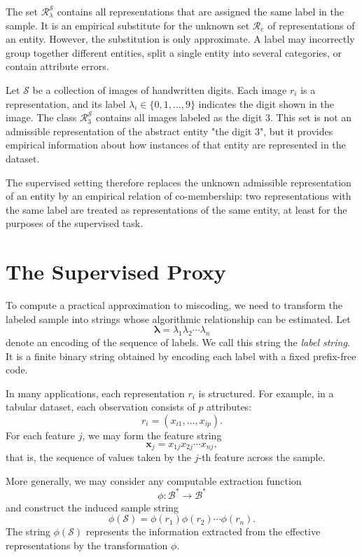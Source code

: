The set $\mathcal {R}_{\lambda}^{\mathcal S}$ contains all representations that are assigned the same label in the sample. It is an empirical substitute for the unknown set $\mathcal{R}_e$ of representations of an entity. However, the substitution is only approximate. A label may incorrectly group together different entities, split a single entity into several categories, or contain attribute errors.

\begin{example}
Let $\mathcal S$ be a collection of images of handwritten digits. Each image $r_i$ is a representation, and its label $\lambda_i\in\{0,1,\ldots,9\}$ indicates the digit shown in the image. The class $\mathcal{R}_{3}^{\mathcal S}$ contains all images labeled as the digit $3$. This set is not an admissible representation of the abstract entity "the digit $3$", but it provides empirical information about how instances of that entity are represented in the dataset.
\end{example}

The supervised setting therefore replaces the unknown admissible representation of an entity by an empirical relation of co-membership: two representations with the same label are treated as representations of the same entity, at least for the purposes of the supervised task.

%
%

\section{The Supervised Proxy}
\label{sec:supervised_proxy}

To compute a practical approximation to miscoding, we need to transform the labeled sample into strings whose algorithmic relationship can be estimated. Let
\[
    \boldsymbol{\lambda}
    =
    \lambda_1\lambda_2\cdots \lambda_n
\]
denote an encoding of the sequence of labels. We call this string the \emph{label string}. It is a finite binary string obtained by encoding each label with a fixed prefix-free code.

In many applications, each representation \(r_i\) is structured. For example, in a tabular dataset, each observation consists of \(p\) attributes:
\[
    r_i = (x_{i1},\ldots,x_{ip}).
\]
For each feature \(j\), we may form the feature string
\[
    \mathbf{x}_j = x_{1j}x_{2j}\cdots x_{nj},
\]
that is, the sequence of values taken by the \(j\)-th feature across the sample.

More generally, we may consider any computable extraction function
\[
    \phi:\mathcal B^\ast \to \mathcal B^\ast
\]
and construct the induced sample string
\[
    \phi(\mathcal S)
    =
    \phi(r_1)\phi(r_2)\cdots \phi(r_n).
\]
The string \(\phi(\mathcal S)\) represents the information extracted from the effective representations by the transformation \(\phi\).

